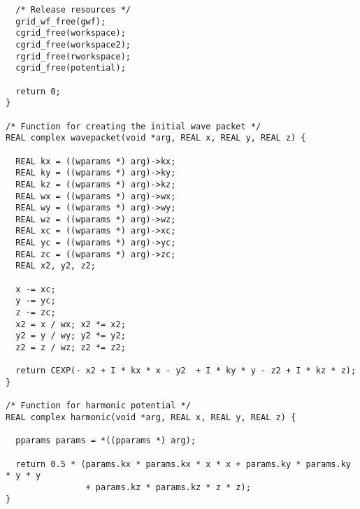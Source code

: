 \documentclass[12pt,letterpaper]{report}
\begin{document}
\begin{verbatim}
  /* Release resources */
  grid_wf_free(gwf);
  cgrid_free(workspace);
  cgrid_free(workspace2);
  rgrid_free(rworkspace);
  cgrid_free(potential);
  
  return 0;
}

/* Function for creating the initial wave packet */
REAL complex wavepacket(void *arg, REAL x, REAL y, REAL z) {

  REAL kx = ((wparams *) arg)->kx;
  REAL ky = ((wparams *) arg)->ky;
  REAL kz = ((wparams *) arg)->kz;
  REAL wx = ((wparams *) arg)->wx;
  REAL wy = ((wparams *) arg)->wy;
  REAL wz = ((wparams *) arg)->wz;
  REAL xc = ((wparams *) arg)->xc;
  REAL yc = ((wparams *) arg)->yc;
  REAL zc = ((wparams *) arg)->zc;
  REAL x2, y2, z2;

  x -= xc;
  y -= yc;
  z -= zc;
  x2 = x / wx; x2 *= x2;
  y2 = y / wy; y2 *= y2;
  z2 = z / wz; z2 *= z2;

  return CEXP(- x2 + I * kx * x - y2  + I * ky * y - z2 + I * kz * z);
}

/* Function for harmonic potential */
REAL complex harmonic(void *arg, REAL x, REAL y, REAL z) {

  pparams params = *((pparams *) arg);

  return 0.5 * (params.kx * params.kx * x * x + params.ky * params.ky * y * y 
                + params.kz * params.kz * z * z);
}
\end{verbatim}
\end{document}
